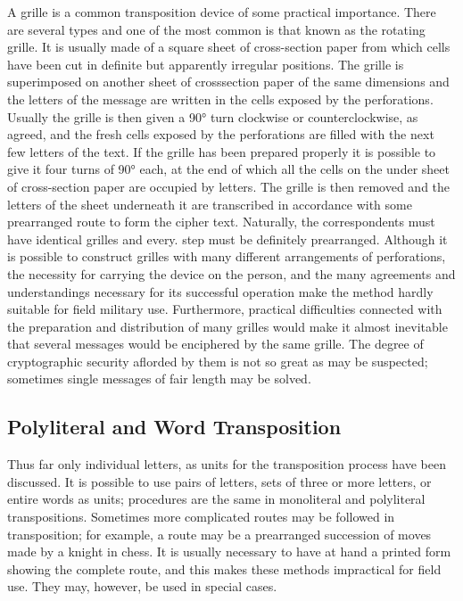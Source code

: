 \mypara A grille is a common transposition device of some practical importance. There are several types and one of the most common is that known
as the rotating grille. It is usually made of a square sheet of cross-section paper from which cells have been cut in definite but apparently
irregular positions. The grille is superimposed on another sheet of crosssection paper of the same dimensions and the letters of the message are
written in the cells exposed by the perforations. Usually the grille is
then given a 90° turn clockwise or counterclockwise, as agreed, and the
fresh cells exposed by the perforations are filled with the next few letters
of the text. If the grille has been prepared properly it is possible to give it
four turns of 90° each, at the end of which all the cells on the under
sheet of cross-section paper are occupied by letters. The grille is then
removed and the letters of the sheet underneath it are transcribed in
accordance with some prearranged route to form the cipher text. Naturally, the correspondents must have identical grilles and every. step must
be definitely prearranged. Although it is possible to construct grilles with
many different arrangements of perforations, the necessity for carrying
the device on the person, and the many agreements and understandings
necessary for its successful operation make the method hardly suitable
for field military use. Furthermore, practical difficulties connected with
the preparation and distribution of many grilles would make it almost
inevitable that several messages would be enciphered by the same grille.
The degree of cryptographic security aﬂorded by them is not so great as
may be suspected; sometimes single messages of fair length may
be solved.

\subsection{Polyliteral and Word Transposition}

\mypara Thus far only individual letters, as units for the transposition
process have been discussed. It is possible to use pairs of letters, sets of
three or more letters, or entire words as units; procedures are the same
in monoliteral and polyliteral transpositions. Sometimes more complicated
routes may be followed in transposition; for example, a route may be a
prearranged succession of moves made by a knight in chess. It is usually
necessary to have at hand a printed form showing the complete route,
and this makes these methods impractical for field use. They may, however, be used in special cases.

